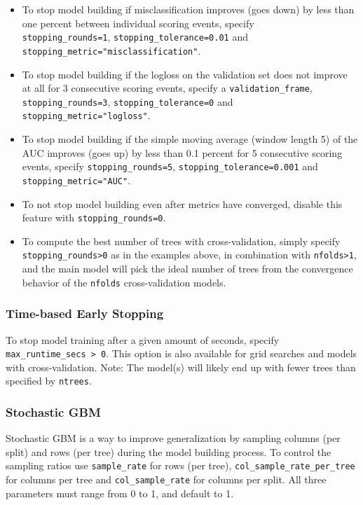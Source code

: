 \begin{itemize}
\item To stop model building if misclassification improves (goes down) by less than one percent between individual scoring events, specify \\\texttt{stopping\_rounds=1}, \texttt{stopping\_tolerance=0.01} and \\\texttt{stopping\_metric="misclassification"}.
\item To stop model building if the logloss on the validation set does not improve at all for 3 consecutive scoring events, specify a \texttt{validation\_frame}, \texttt{stopping\_rounds=3}, \texttt{stopping\_tolerance=0} and \\\texttt{stopping\_metric="logloss"}.
\item To stop model building if the simple moving average (window length 5) of the AUC improves (goes up) by less than 0.1 percent for 5 consecutive scoring events, specify \texttt{stopping\_rounds=5}, \texttt{stopping\_tolerance=0.001} and \texttt{stopping\_metric="AUC"}.
\item To not stop model building even after metrics have converged, disable this feature with \texttt{stopping\_rounds=0}.
\item To compute the best number of trees with cross-validation, simply specify \texttt{stopping\_rounds>0} as in the examples above, in combination with \texttt{nfolds>1}, and the main model will pick the ideal number of trees from the convergence behavior of the \texttt{nfolds} cross-validation models.
\end{itemize}

\subsubsection{Time-based Early Stopping}
To stop model training after a given amount of seconds, specify \texttt{max\_runtime\_secs > 0}. This option is also available for grid searches and models with cross-validation. Note: The model(s) will likely end up with fewer trees than specified by \texttt{ntrees}.

\subsubsection{Stochastic GBM}
Stochastic GBM is a way to improve generalization by sampling columns (per split) and rows (per tree) during the model building process. To control the sampling ratios use \texttt{sample\_rate} for rows (per tree), \texttt{col\_sample\_rate\_per\_tree} for columns per tree and \texttt{col\_sample\_rate} for columns per split. All three parameters must range from 0 to 1, and default to 1.

